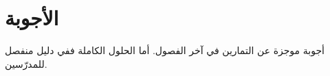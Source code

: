 \chapter{الأجوبة}
\label{sec:answers}

أجوبة موجزة عن التمارين في آخر الفصول. أما الحلول الكاملة ففي دليل منفصل للمدرّسين.























